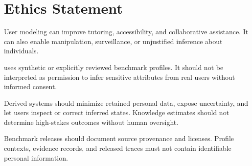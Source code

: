 \section*{Ethics Statement}

User modeling can improve tutoring, accessibility, and collaborative assistance. It can also enable manipulation, surveillance, or unjustified inference about individuals.

\knowact uses synthetic or explicitly reviewed benchmark profiles. It should not be interpreted as permission to infer sensitive attributes from real users without informed consent.

Derived systems should minimize retained personal data, expose uncertainty, and let users inspect or correct inferred states. Knowledge estimates should not determine high-stakes outcomes without human oversight.

Benchmark releases should document source provenance and licenses. Profile contexts, evidence records, and released traces must not contain identifiable personal information.
